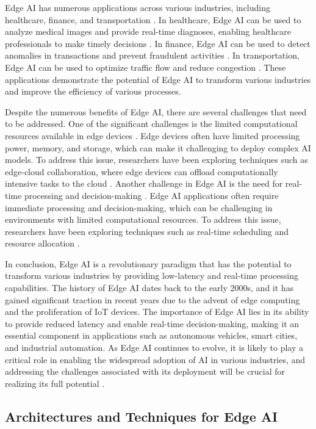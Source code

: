 \documentclass[11pt]{article}
\begin{document}
Edge AI has numerous applications across various industries, including healthcare, finance, and transportation \cite{ref168}. In healthcare, Edge AI can be used to analyze medical images and provide real-time diagnoses, enabling healthcare professionals to make timely decisions \cite{ref97}. In finance, Edge AI can be used to detect anomalies in transactions and prevent fraudulent activities \cite{ref169}. In transportation, Edge AI can be used to optimize traffic flow and reduce congestion \cite{ref170}. These applications demonstrate the potential of Edge AI to transform various industries and improve the efficiency of various processes.

Despite the numerous benefits of Edge AI, there are several challenges that need to be addressed. One of the significant challenges is the limited computational resources available in edge devices \cite{ref171}. Edge devices often have limited processing power, memory, and storage, which can make it challenging to deploy complex AI models. To address this issue, researchers have been exploring techniques such as edge-cloud collaboration, where edge devices can offload computationally intensive tasks to the cloud \cite{ref172}. Another challenge in Edge AI is the need for real-time processing and decision-making \cite{ref173}. Edge AI applications often require immediate processing and decision-making, which can be challenging in environments with limited computational resources. To address this issue, researchers have been exploring techniques such as real-time scheduling and resource allocation \cite{ref174}.

In conclusion, Edge AI is a revolutionary paradigm that has the potential to transform various industries by providing low-latency and real-time processing capabilities. The history of Edge AI dates back to the early 2000s, and it has gained significant traction in recent years due to the advent of edge computing and the proliferation of IoT devices. The importance of Edge AI lies in its ability to provide reduced latency and enable real-time decision-making, making it an essential component in applications such as autonomous vehicles, smart cities, and industrial automation. As Edge AI continues to evolve, it is likely to play a critical role in enabling the widespread adoption of AI in various industries, and addressing the challenges associated with its deployment will be crucial for realizing its full potential \cite{ref175}.

\subsection{Architectures and Techniques for Edge AI}
\end{document}
